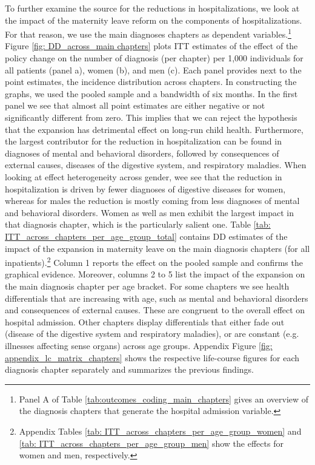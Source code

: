 \documentclass[11pt, a4paper]{article} %
\begin{document}
To further examine the source for the reductions in hospitalizations, we look at the impact of the maternity leave reform on the components of hospitalizations. For that reason, we use the main diagnoses chapters as dependent variables.\footnote{Panel A of Table \ref{tab:outcomes_coding_main_chapters} gives an overview of the diagnosis chapters that generate the hospital admission variable.} Figure \ref{fig: DD_across_main chapters} plots ITT estimates of the effect of the policy change on the number of diagnosis (per chapter) per 1,000 individuals for all patients (panel a), women (b), and men (c). Each panel provides next to the point estimates, the incidence distribution across chapters. In constructing the graphs, we used the pooled sample and a bandwidth of six months. In the first panel we see that almost all point estimates are either negative or not significantly different from zero. This implies that we can reject the hypothesis that the expansion has detrimental effect on long-run child health. Furthermore, the largest contributor for the reduction in hospitalization can be found in diagnoses of mental and behavioral disorders, followed by consequences of external causes, diseases of the digestive system, and respiratory maladies. When looking at effect heterogeneity across gender, wee see that the reduction in hospitalization is driven by fewer diagnoses of digestive diseases for women, whereas for males the reduction is mostly coming from less diagnoses of mental and behavioral disorders. Women as well as men exhibit the largest impact in that diagnosis chapter, which is the particularly salient one. \newline
Table \ref{tab: ITT_across_chapters_per_age_group_total} contains DD estimates of the impact of the expansion in maternity leave on the main diagnosis chapters (for all inpatients).\footnote{Appendix Tables \ref{tab: ITT_across_chapters_per_age_group_women} and \ref{tab: ITT_across_chapters_per_age_group_men} show the effects for women and men, respectively.} Column 1 reports the effect on the pooled sample and confirms the graphical evidence. Moreover, columns 2 to 5 list the impact of the expansion on the main diagnosis chapter per age bracket. For some chapters we see health differentials that are increasing with age, such as mental and behavioral disorders and consequences of external causes. These are congruent to the overall effect on hospital admission. Other chapters display differentials that either fade out (disease of the digestive system and respiratory maladies), or are constant (e.g. illnesses affecting sense organs) across age groups. Appendix Figure \ref{fig: appendix_lc_matrix_chapters} shows the respective life-course figures for each diagnosis chapter separately and summarizes the previous findings. \newline 
\end{document}
